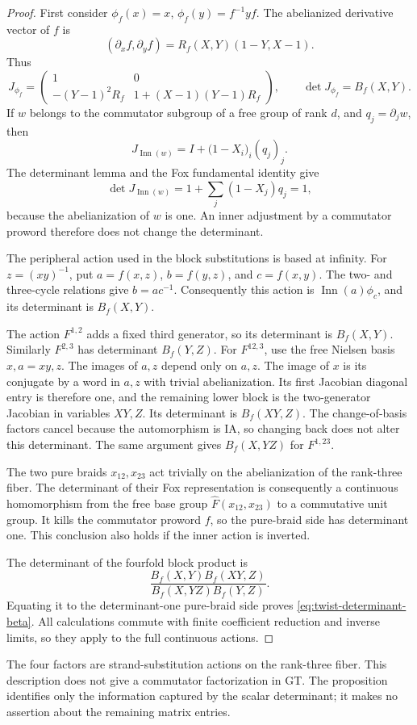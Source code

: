 \begin{proof}
First consider \(\phi_f(x)=x\), \(\phi_f(y)=f^{-1}yf\).
The abelianized derivative vector of \(f\) is
\[
 (\partial_x f,\partial_y f)
          =R_f(X,Y)(1-Y,X-1).
\]
Thus
\[
 J_{\phi_f}=
 \begin{pmatrix}
 1&0\\
 -(Y-1)^2R_f&1+(X-1)(Y-1)R_f
 \end{pmatrix},
 \qquad \det J_{\phi_f}=B_f(X,Y).
\]
If \(w\) belongs to the commutator subgroup of a free group of
rank \(d\), and \(q_j=\partial_j w\), then
\[
 J_{\operatorname{Inn}(w)}
   =I+\bigl(1-X_i\bigr)_i(q_j)_j.
\]
The determinant lemma and the Fox fundamental identity give
\[
 \det J_{\operatorname{Inn}(w)}
 =1+\sum_j(1-X_j)q_j=1,
\]
because the abelianization of \(w\) is one. An inner adjustment
by a commutator proword therefore does not change the determinant.

The peripheral action used in the block substitutions is based at
infinity. For \(z=(xy)^{-1}\), put \(a=f(x,z)\),
\(b=f(y,z)\), and \(c=f(x,y)\). The two- and three-cycle
relations give \(b=ac^{-1}\). Consequently this action is
\(\operatorname{Inn}(a)\phi_c\), and its determinant is
\(B_f(X,Y)\).

The action \(F^{1,2}\) adds a fixed third generator, so its
determinant is \(B_f(X,Y)\). Similarly \(F^{2,3}\) has
determinant \(B_f(Y,Z)\). For \(F^{12,3}\), use the free
Nielsen basis \(x,a=xy,z\). The images of \(a,z\) depend only
on \(a,z\). The image of \(x\) is its conjugate by a word in
\(a,z\) with trivial abelianization. Its first Jacobian diagonal
entry is therefore one, and the remaining lower block is the
two-generator Jacobian in variables \(XY,Z\). Its determinant
is \(B_f(XY,Z)\). The change-of-basis factors cancel because
the automorphism is IA, so changing back does not alter this
determinant. The same argument gives \(B_f(X,YZ)\) for
\(F^{1,23}\).

The two pure braids \(x_{12},x_{23}\) act trivially on the
abelianization of the rank-three fiber. The determinant of their
Fox representation is consequently a continuous homomorphism from
the free base group \(\widehat F(x_{12},x_{23})\) to a
commutative unit group. It kills the commutator proword \(f\),
so the pure-braid side has determinant one. This conclusion also
holds if the inner action is inverted.

The determinant of the fourfold block product is
\[
 \frac{B_f(X,Y)B_f(XY,Z)}{B_f(X,YZ)B_f(Y,Z)}.
\]
Equating it to the determinant-one pure-braid side proves
\eqref{eq:twist-determinant-beta}. All calculations commute with
finite coefficient reduction and inverse limits, so they apply to
the full continuous actions.
\end{proof}

The four factors are strand-substitution actions on the rank-three
fiber. This description does not give a commutator factorization in
GT. The proposition identifies only the information captured by the
scalar determinant; it makes no assertion about the remaining
matrix entries.
